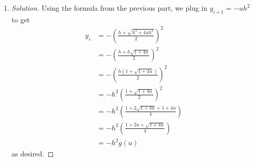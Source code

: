 \documentclass{article}
\begin{document}
\begin{enumerate}
\begin{proof}[Solution]
\begin{enumerate}
				Now, we substitute $x = \sqrt{-y_i}$ to recover
				\[
					\sqrt{-y_i} = \frac{h + \sqrt{h^2 - 4y_{i+1}}}{2}
					\implies y_i = -\left(\frac{h + \sqrt{h^2 - 4y_{i+1}}}{2}\right)^{2}
				\]
				as desired.
		\end{enumerate}
	\end{proof}
	\item \begin{proof}[Solution]\let\qed\relax
		Using the formula from the previous part, we plug in $y_{i+1} = -uh^2$ to get
		\begin{align*}
			y_i &= -\left(\frac{h + \sqrt{h^2+4uh^2}}{2}\right)^2\\
				&= -\left(\frac{h + h\sqrt{1+4u}}{2}\right)^2\\
				&= -\left(\frac{h(1 + \sqrt{1+4u})}{2}\right)^2\\
				&= -h^2\left(\frac{1 + \sqrt{1+4u}}{2}\right)^2\\
				&= -h^2\left(\frac{1 + 2\sqrt{1+4u} + 1 + 4u}{4}\right)\\
				&= -h^2\left(\frac{1 + 2u + \sqrt{1+4u}}{4}\right)\\
				&= -h^2g(u)
		\end{align*}
		as desired.
	\end{proof}
\end{enumerate}
\end{document}
